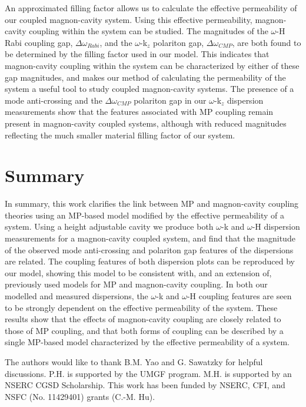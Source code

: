 \documentclass[prb,twocolumn,showpacs,preprintnumbers,amsmath,amssymb]{revtex4-1}
\begin{document}
An approximated filling factor allows us to calculate the effective permeability of our coupled magnon-cavity system. Using this effective permeability, magnon-cavity coupling within the system can be studied. The magnitudes of the $\omega$-H Rabi coupling gap, $\Delta\omega_{Rabi}$, and the $\omega$-k$_{z}$ polariton gap, $\Delta\omega_{CMP}$, are both found to be determined by the filling factor used in our model. This indicates that magnon-cavity coupling within the system can be characterized by either of these gap magnitudes, and makes our method of calculating the permeability of the system a useful tool to study coupled magnon-cavity systems. The presence of a mode anti-crossing and the $\Delta\omega_{CMP}$ polariton gap in our $\omega$-k$_{z}$ dispersion measurements show that the features associated with MP coupling remain present in magnon-cavity coupled systems, although with reduced magnitudes reflecting the much smaller material filling factor of our system. 





\section{Summary}

In summary, this work clarifies the link between MP and magnon-cavity coupling theories using an MP-based model modified by the effective permeability of a system. Using a height adjustable cavity we produce both $\omega$-k and $\omega$-H dispersion measurements for a magnon-cavity coupled system, and find that the magnitude of the observed mode anti-crossing and polariton gap features of the dispersions are related. The coupling features of both dispersion plots can be reproduced by our model, showing this model to be consistent with, and an extension of, previously used models for MP and magnon-cavity coupling. In both our modelled and measured dispersions, the $\omega$-k and $\omega$-H coupling features are seen to be strongly dependent on the effective permeability of the system. These results show that the effects of magnon-cavity coupling are closely related to those of MP coupling, and that both forms of coupling can be described by a single MP-based model characterized by the effective permeability of a system. 


The authors would like to thank B.M. Yao and G. Sawatzky for helpful discussions. P.H. is supported by the UMGF program. M.H. is supported by an NSERC CGSD Scholarship. This work has been funded by NSERC, CFI, and NSFC (No. 11429401) grants (C.-M. Hu).
\end{document}
